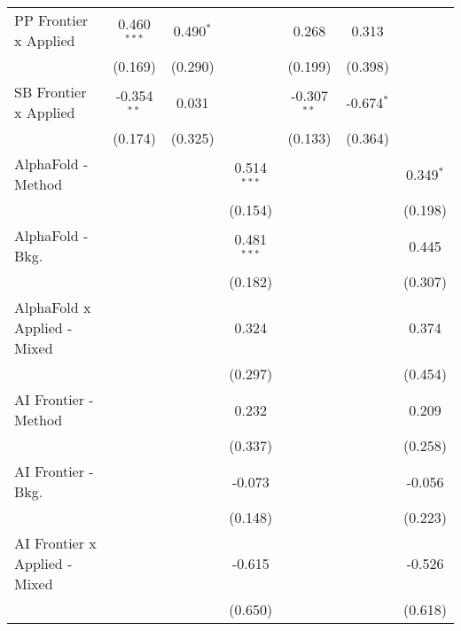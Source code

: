 \begin{tabular}{lcccccc}
   PP Frontier x Applied          & 0.460$^{***}$ & 0.490$^{*}$   &               & 0.268         & 0.313         &   \\   
                                  & (0.169)       & (0.290)       &               & (0.199)       & (0.398)       &   \\   
   SB Frontier x Applied          & -0.354$^{**}$ & 0.031         &               & -0.307$^{**}$ & -0.674$^{*}$  &   \\   
                                  & (0.174)       & (0.325)       &               & (0.133)       & (0.364)       &   \\   
   AlphaFold - Method             &               &               & 0.514$^{***}$ &               &               & 0.349$^{*}$\\   
                                  &               &               & (0.154)       &               &               & (0.198)\\   
   AlphaFold - Bkg.               &               &               & 0.481$^{***}$ &               &               & 0.445\\   
                                  &               &               & (0.182)       &               &               & (0.307)\\   
   AlphaFold x Applied - Mixed    &               &               & 0.324         &               &               & 0.374\\   
                                  &               &               & (0.297)       &               &               & (0.454)\\   
   AI Frontier - Method           &               &               & 0.232         &               &               & 0.209\\   
                                  &               &               & (0.337)       &               &               & (0.258)\\   
   AI Frontier - Bkg.             &               &               & -0.073        &               &               & -0.056\\   
                                  &               &               & (0.148)       &               &               & (0.223)\\   
   AI Frontier x Applied - Mixed  &               &               & -0.615        &               &               & -0.526\\   
                                  &               &               & (0.650)       &               &               & (0.618)\\   

\end{tabular}
